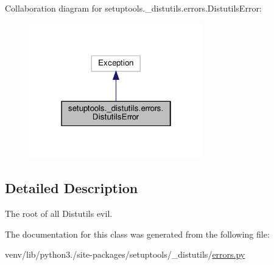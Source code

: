 Collaboration diagram for setuptools.\+\_\+distutils.\+errors.\+Distutils\+Error\+:
\nopagebreak
\begin{figure}[H]
\begin{center}
\leavevmode
\includegraphics[width=214pt]{classsetuptools_1_1__distutils_1_1errors_1_1DistutilsError__coll__graph}
\end{center}
\end{figure}


\subsection{Detailed Description}
\begin{DoxyVerb}The root of all Distutils evil.\end{DoxyVerb}
 

The documentation for this class was generated from the following file\+:\begin{DoxyCompactItemize}
\item 
venv/lib/python3./site-\/packages/setuptools/\+\_\+distutils/\hyperlink{__distutils_2errors_8py}{errors.\+py}\end{DoxyCompactItemize}
